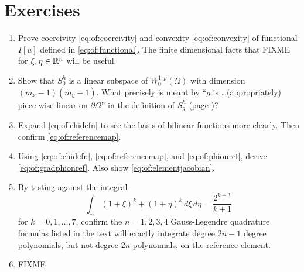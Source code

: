 \section{Exercises}

\renewcommand{\labelenumi}{\arabic{chapter}.\arabic{enumi}\quad}
\renewcommand{\labelenumii}{(\alph{enumii})}
\begin{enumerate}
\item Prove coercivity \eqref{eq:of:coercivity} and convexity \eqref{eq:of:convexity} of functional $I[u]$ defined in \eqref{eq:of:functional}.  The finite dimensional facts that FIXME for $\xi,\eta\in\mathbb{R}^n$ will be useful.

\item Show that $S_0^h$ is a linear subspace of $W_0^{1,p}(\Omega)$ with dimension $(m_x-1)(m_y-1)$.  What precisely is meant by ``$g$ is \dots (appropriately) piece-wise linear on $\partial\Omega$'' in the definition of $S_g^h$ (page \pageref{eq:of:Shdefn})?

\item Expand \eqref{eq:of:chidefn} to see the basis of bilinear functions more clearly.  Then confirm \eqref{eq:of:referencemap}.

\item Using \eqref{eq:of:chidefn}, \eqref{eq:of:referencemap}, and \eqref{eq:of:phionref}, derive \eqref{eq:of:gradphionref}.  Also show \eqref{eq:of:elementjacobian}.

\item By testing against the integral
    $$\int_{\square_\ast} (1+\xi)^k + (1+\eta)^k\,d\xi\, d\eta = \frac{2^{k+3}}{k+1}$$
for $k=0,1,\dots,7$, confirm the $n=1,2,3,4$ Gauss-Legendre quadrature formulas listed in the text will exactly integrate degree $2n-1$ degree polynomials, but not degree $2n$ polynomials, on the reference element.

\item FIXME
\end{enumerate}